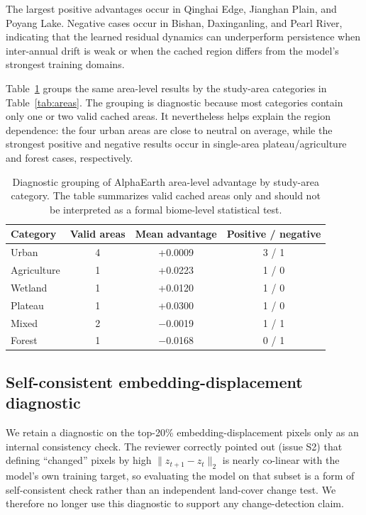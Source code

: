 \documentclass{article}
\begin{document}
The largest positive advantages occur in Qinghai Edge, Jianghan Plain, and Poyang Lake. Negative cases occur in Bishan, Daxinganling, and Pearl River, indicating that the learned residual dynamics can underperform persistence when inter-annual drift is weak or when the cached region differs from the model's strongest training domains.

Table~\ref{tab:category_diagnostic} groups the same area-level results by the study-area categories in Table~\ref{tab:areas}. The grouping is diagnostic because most categories contain only one or two valid cached areas. It nevertheless helps explain the region dependence: the four urban areas are close to neutral on average, while the strongest positive and negative results occur in single-area plateau/agriculture and forest cases, respectively.

\begin{table}[htbp]
\centering
\caption{Diagnostic grouping of AlphaEarth area-level advantage by study-area category. The table summarizes valid cached areas only and should not be interpreted as a formal biome-level statistical test.}
\label{tab:category_diagnostic}
\small
\begin{tabular}{lccc}
\toprule
Category & Valid areas & Mean advantage & Positive / negative \\
\midrule
Urban & 4 & +0.0009 & 3 / 1 \\
Agriculture & 1 & +0.0223 & 1 / 0 \\
Wetland & 1 & +0.0120 & 1 / 0 \\
Plateau & 1 & +0.0300 & 1 / 0 \\
Mixed & 2 & $-$0.0019 & 1 / 1 \\
Forest & 1 & $-$0.0168 & 0 / 1 \\
\bottomrule
\end{tabular}
\end{table}

\subsection{Self-consistent embedding-displacement diagnostic}
\label{sec:embedding_displacement_diagnostic}

We retain a diagnostic on the top-20\% embedding-displacement pixels only as an internal consistency check. The reviewer correctly pointed out (issue S2) that defining ``changed'' pixels by high $\|z_{t+1}-z_t\|_2$ is nearly co-linear with the model's own training target, so evaluating the model on that subset is a form of self-consistent check rather than an independent land-cover change test. We therefore no longer use this diagnostic to support any change-detection claim.
\end{document}
